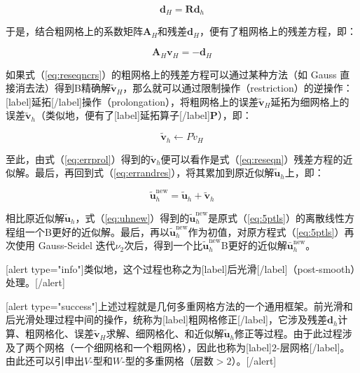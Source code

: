 \documentclass[12pt, UTF8, nofonts]{ctexart}
\begin{document}
\begin{equation}
  \label{eq:resrestrict}
  \boldsymbol{d}_H = \boldsymbol{R}\boldsymbol{d}_h
\end{equation}

于是，结合粗网格上的系数矩阵$\boldsymbol{A}_H$和残差$\boldsymbol{d}_H$，便有了粗网格上的残差方程，即：

\begin{equation}
  \label{eq:reseqncrs}
  \boldsymbol{A}_H\boldsymbol{v}_H = -\boldsymbol{d}_H
\end{equation}

如果式（\ref{eq:reseqncrs}）的粗网格上的残差方程可以通过某种方法（如 Gauss 直接消去法）得到B精确解$\tilde{\boldsymbol{v}}_H$，那么就可以通过限制操作（restriction）的逆操作：[label]延拓[/label]操作（prolongation），将粗网格上的误差$\tilde{\boldsymbol{v}}_H$延拓为细网格上的误差$\tilde{\boldsymbol{v}}_h$（类似地，便有了[label]延拓算子[/label]$\boldsymbol{P}$），即：

\begin{equation}
  \label{eq:errprol}
  \tilde{\boldsymbol{v}}_h \gets P\tilde{v}_H
\end{equation}

至此，由式（\ref{eq:errprol}）得到的$\tilde{\boldsymbol{v}}_h$便可以看作是式（\ref{eq:reseqn}）残差方程的近似解。最后，再回到式（\ref{eq:errandres}），将其累加到原近似解$\tilde{\boldsymbol{u}}_h$上，即：

\begin{equation}
  \label{eq:uhnew}
  \tilde{\boldsymbol{u}}_h^{\mathrm{new}} = \tilde{\boldsymbol{u}}_h + \tilde{\boldsymbol{v}}_h
\end{equation}

相比原近似解$\tilde{\boldsymbol{u}}_h$，式（\ref{eq:uhnew}）得到的$\tilde{\boldsymbol{u}}_h^{\mathrm{new}}$是原式（\ref{eq:5ptls}）的离散线性方程组一个B更好的近似解。最后，再以$\tilde{\boldsymbol{u}}_h^{\mathrm{new}}$作为初值，对原方程式（\ref{eq:5ptls}）再次使用 Gauss-Seidel 迭代$\nu_2$次后，得到一个比$\tilde{\boldsymbol{u}}_h^{\mathrm{new}}$B更好的近似解$\bar{\boldsymbol{u}}_h^{\mathrm{new}}$。

[alert type="info"]类似地，这个过程也称之为[label]后光滑[/label]（post-smooth）处理。[/alert]

[alert type="success"]上述过程就是几何多重网格方法的一个通用框架。前光滑和后光滑处理过程中间的操作，统称为[label]粗网格修正[/label]，它涉及残差$\boldsymbol{d}_h$计算、粗网格化、误差$\tilde{\boldsymbol{v}}_H$求解、细网格化、和近似解$\tilde{\boldsymbol{u}}_h$修正等过程。由于此过程涉及了两个网格（一个细网格和一个粗网格），因此也称为[label]$2$-层网格[/label]。由此还可以引申出$V$-型和$W$-型的多重网格（层数$>2$）。[/alert]
\end{document}
